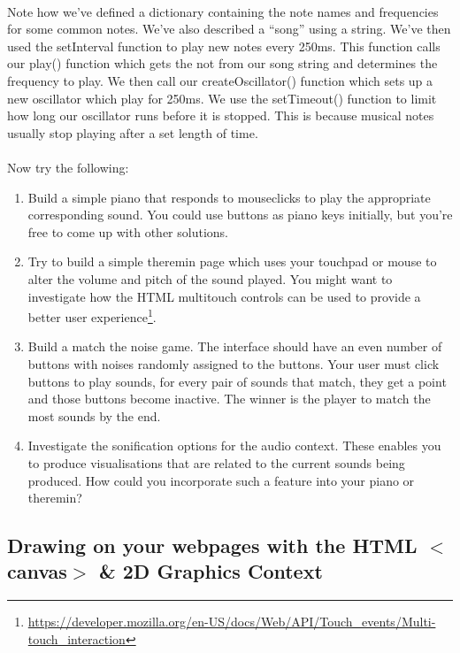 \documentclass[10pt, a4paper]{article}
\begin{document}
\paragraph{} Note how we've defined a dictionary containing the note names and frequencies for some common notes. We've also described a ``song'' using a string. We've then used the setInterval function to play new notes every 250ms. This function calls our play() function which gets the not from our song string and determines the frequency to play. We then call our createOscillator() function which sets up a new oscillator which play for 250ms. We use the setTimeout() function to limit how long our oscillator runs before it is stopped. This is because musical notes usually stop playing after a set length of time.

\paragraph{} Now try the following:
\begin{enumerate}
\item Build a simple piano that responds to mouseclicks to play the appropriate corresponding sound. You could use buttons as piano keys initially, but you're free to come up with other solutions.
\item Try to build a simple theremin page which uses your touchpad or mouse to alter the volume and pitch of the sound played. You might want to investigate how the HTML multitouch controls can be used to provide a better user experience\footnote{\url{https://developer.mozilla.org/en-US/docs/Web/API/Touch_events/Multi-touch_interaction}}.
\item Build a match the noise game. The interface should have an even number of buttons with noises randomly assigned to the buttons. Your user must click buttons to play sounds, for every pair of sounds that match, they get a point and those buttons become inactive. The winner is the player to match the most sounds by the end.
\item Investigate the sonification options for the audio context. These enables you to produce visualisations that are related to the current sounds being produced. How could you incorporate such a feature into your piano or theremin?
\end{enumerate}



\subsection{Drawing on your webpages with the HTML $<$canvas$>$ \& 2D Graphics Context}
\end{document}
